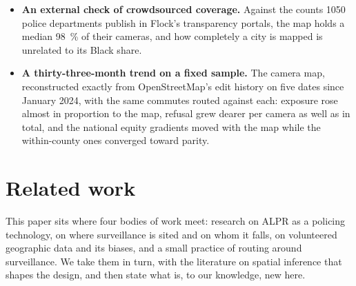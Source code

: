 \documentclass[11pt,twoside]{article}
\newcommand{\alpr}{ALPR\xspace}
\begin{document}
\begin{itemize}
    \SIrange{27}{59}{\percent} more densely per kilometre in the most-Black tracts and
    \SI{20}{\percent} more densely per vehicle-kilometre, inside those neighbourhoods rather than
    at their edges, while wealthy neighbourhoods and towns concentrate
    theirs at their edges and limits. Within a county, what commuters pass is close to equal;
    where cameras stand is not.
  \item \textbf{An external check of crowdsourced coverage.} Against the counts \num{1050}
    police departments publish in Flock's transparency portals, the map holds a median
    \SI{98}{\percent} of their cameras, and how completely a city is mapped is unrelated to its
    Black share.
  \item \textbf{A thirty-three-month trend on a fixed sample.} The camera map, reconstructed
    exactly from OpenStreetMap's edit history on five dates since January 2024, with the
    same commutes routed against each: exposure rose almost in proportion to the map,
    refusal grew dearer per camera as well as in total, and the national equity gradients
    moved with the map while the within-county ones converged toward parity.
\end{itemize}

\section{Related work}
\label{sec:related}

This paper sits where four bodies of work meet: research on \alpr as a policing technology, on
where surveillance is sited and on whom it falls, on volunteered geographic data and its biases,
and a small practice of routing around surveillance. We take them in turn, with the literature
on spatial inference that shapes the design, and then state what is, to our knowledge, new here.
\end{document}

